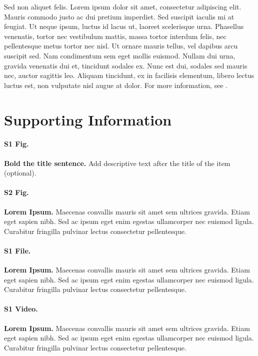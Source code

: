 \documentclass[10pt,letterpaper]{article}
\begin{document}
Sed non aliquet felis. Lorem ipsum dolor sit amet, consectetur adipiscing elit. Mauris commodo justo ac dui pretium imperdiet. Sed suscipit iaculis mi at feugiat. Ut neque ipsum, luctus id lacus ut, laoreet scelerisque urna. Phasellus venenatis, tortor nec vestibulum mattis, massa tortor interdum felis, nec pellentesque metus tortor nec nisl. Ut ornare mauris tellus, vel dapibus arcu suscipit sed. Nam condimentum sem eget mollis euismod. Nullam dui urna, gravida venenatis dui et, tincidunt sodales ex. Nunc est dui, sodales sed mauris nec, auctor sagittis leo. Aliquam tincidunt, ex in facilisis elementum, libero lectus luctus est, non vulputate nisl augue at dolor. For more information, see .

\section*{Supporting Information}

\paragraph*{S1 Fig.}
\label{S1_Fig}
{\bf Bold the title sentence.} Add descriptive text after the title of the item (optional).

\paragraph*{S2 Fig.}
\label{S2_Fig}
{\bf Lorem Ipsum.} Maecenas convallis mauris sit amet sem ultrices gravida. Etiam eget sapien nibh. Sed ac ipsum eget enim egestas ullamcorper nec euismod ligula. Curabitur fringilla pulvinar lectus consectetur pellentesque.

\paragraph*{S1 File.}
\label{S1_File}
{\bf Lorem Ipsum.}  Maecenas convallis mauris sit amet sem ultrices gravida. Etiam eget sapien nibh. Sed ac ipsum eget enim egestas ullamcorper nec euismod ligula. Curabitur fringilla pulvinar lectus consectetur pellentesque.

\paragraph*{S1 Video.}
\label{S1_Video}
{\bf Lorem Ipsum.}  Maecenas convallis mauris sit amet sem ultrices gravida. Etiam eget sapien nibh. Sed ac ipsum eget enim egestas ullamcorper nec euismod ligula. Curabitur fringilla pulvinar lectus consectetur pellentesque.
\end{document}
